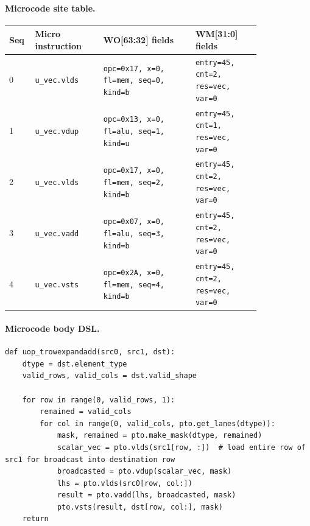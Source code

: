 \paragraph{Microcode site table.}
{\scriptsize
\begin{longtable}{@{}R{0.055\linewidth}L{0.23\linewidth}L{0.31\linewidth}L{0.22\linewidth}@{}}
\toprule
Seq & Micro instruction & WO[63:32] fields & WM[31:0] fields \\
 & \texttt{u\_vec.vlds} & \texttt{opc=0x17, x=0, fl=mem, seq=0, kind=b} & \texttt{entry=45, cnt=2, res=vec, var=0} \\
1 & \texttt{u\_vec.vdup} & \texttt{opc=0x13, x=0, fl=alu, seq=1, kind=u} & \texttt{entry=45, cnt=1, res=vec, var=0} \\
2 & \texttt{u\_vec.vlds} & \texttt{opc=0x17, x=0, fl=mem, seq=2, kind=b} & \texttt{entry=45, cnt=2, res=vec, var=0} \\
3 & \texttt{u\_vec.vadd} & \texttt{opc=0x07, x=0, fl=alu, seq=3, kind=b} & \texttt{entry=45, cnt=2, res=vec, var=0} \\
4 & \texttt{u\_vec.vsts} & \texttt{opc=0x2A, x=0, fl=mem, seq=4, kind=b} & \texttt{entry=45, cnt=2, res=vec, var=0} \\
\bottomrule
\end{longtable}
}
\paragraph{Microcode body DSL.}
\begin{lstlisting}[style=ptocode]
def uop_trowexpandadd(src0, src1, dst):
    dtype = dst.element_type
    valid_rows, valid_cols = dst.valid_shape

    for row in range(0, valid_rows, 1):
        remained = valid_cols
        for col in range(0, valid_cols, pto.get_lanes(dtype)):
            mask, remained = pto.make_mask(dtype, remained)
            scalar_vec = pto.vlds(src1[row, :])  # load entire row of src1 for broadcast into destination row
            broadcasted = pto.vdup(scalar_vec, mask)
            lhs = pto.vlds(src0[row, col:])
            result = pto.vadd(lhs, broadcasted, mask)
            pto.vsts(result, dst[row, col:], mask)
    return
\end{lstlisting}
\Needspace{0.34\textheight}

